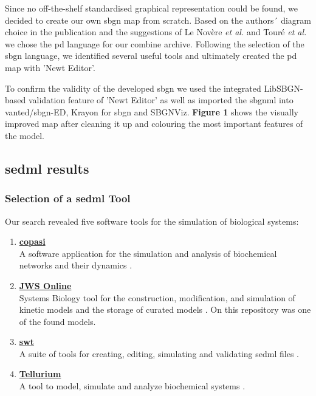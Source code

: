 Since no off-the-shelf standardised graphical representation could be found, we decided to create our own \ac{sbgn} map from scratch. Based on the authors´ diagram choice in the publication and the suggestions of Le Novère \textit{et al.} \cite{sbgnnovere} and Touré \textit{et al.} \cite{sbgntoure} we chose the \ac{pd} language for our \ac{combine} archive. Following the selection of the \ac{sbgn} language, we identified several useful tools and ultimately created the \ac{pd} map with 'Newt Editor'. 

To confirm the validity of the developed \ac{sbgn} we used the integrated LibSBGN-based validation feature of 'Newt Editor' as well as imported the \ac{sbgnml} into \acs{vanted}/\acs{sbgn}-ED, Krayon for \ac{sbgn} and SBGNViz. \textbf{Figure 1} shows the visually improved map after cleaning it up and colouring the most important features of the model.

\subsection*{\acf{sedml} results}

\subsubsection*{Selection of a \acs{sedml} Tool}

Our search revealed five software tools for the simulation of biological systems:
\begin{enumerate} 
    \item \hyperlink{http://copasi.org/}{\textbf{\ac{copasi}}}\\
    A software application for the simulation and analysis of biochemical networks and their dynamics \cite{copasi}.
   
    \item \hyperlink{https://www.systemsmedicine.net/posts/jws-online-biological-systems-modelling}{\textbf{JWS Online}}\\
    Systems Biology tool for the construction, modification, and simulation of kinetic models and the storage of curated models \cite{jwsonline}. On this repository was one of the found models.
   
    \item \hyperlink{https://sed-ml.org/}{\textbf{\ac{swt}}}\\
    A suite of tools for creating, editing, simulating and validating \ac{sedml} files \cite{sedml}. 
   
    \item \hyperlink{https://tellurium.readthedocs.io/en/latest/}{\textbf{Tellurium}}\\
    A tool to model, simulate and analyze biochemical systems \cite{tellurium}.
    
\end{enumerate}


